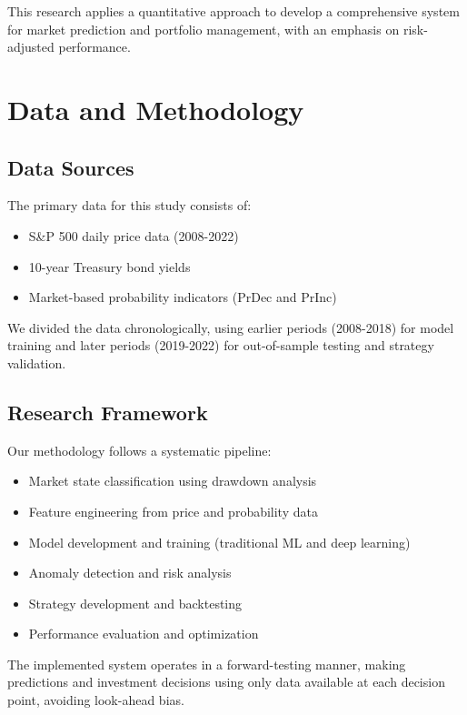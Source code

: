 \documentclass[13pt]{article}
\begin{document}
This research applies a quantitative approach to develop a comprehensive system for market prediction and portfolio management, with an emphasis on risk-adjusted performance.

\section{Data and Methodology}
\subsection{Data Sources}
The primary data for this study consists of:
\begin{itemize}
	\item S\&P 500 daily price data (2008-2022)
	\item 10-year Treasury bond yields
	\item Market-based probability indicators (PrDec and PrInc)
\end{itemize}

We divided the data chronologically, using earlier periods (2008-2018) for model training and later periods (2019-2022) for out-of-sample testing and strategy validation.

\subsection{Research Framework}
Our methodology follows a systematic pipeline:
\begin{itemize}

	\item Market state classification using drawdown analysis
	\item Feature engineering from price and probability data
	\item Model development and training (traditional ML and deep learning)
	\item Anomaly detection and risk analysis
	\item Strategy development and backtesting
	\item Performance evaluation and optimization
\end{itemize}

The implemented system operates in a forward-testing manner, making predictions and investment decisions using only data available at each decision point, avoiding look-ahead bias.
\end{document}
